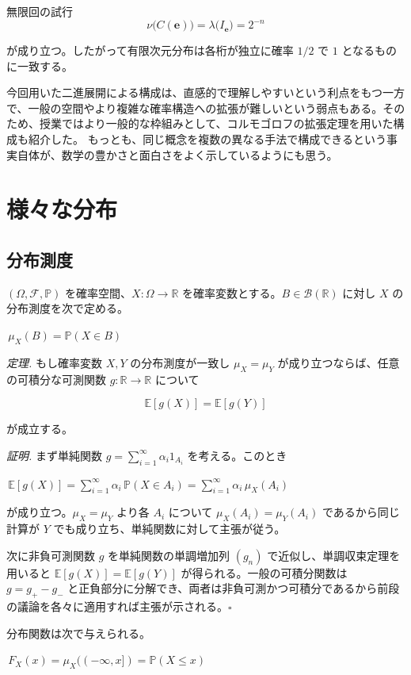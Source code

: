 \documentclass[uplatex,dvipdfmx,11pt,a4paper,openany]{bxjsbook}
\newcommand{\columnheading}[1]{\par\medskip{\large\color{ColumnInk}#1}\par\smallskip}
\begin{document}
\begin{columnbox}{無限回の試行}
\[
            \nu\bigl(C(\mathbf{e})\bigr) = \lambda\bigl(I_{\mathbf{e}}\bigr) = 2^{-n}
          \]

が成り立つ。したがって有限次元分布は各桁が独立に確率 $1/2$ で $1$ となるものに一致する。

\columnheading{まとめ}
今回用いた二進展開による構成は、直感的で理解しやすいという利点をもつ一方で、一般の空間やより複雑な確率構造への拡張が難しいという弱点もある。そのため、授業ではより一般的な枠組みとして、コルモゴロフの拡張定理を用いた構成も紹介した。
もっとも、同じ概念を複数の異なる手法で構成できるという事実自体が、数学の豊かさと面白さをよく示しているようにも思う。

\end{columnbox}

\chapter{様々な分布}
\section{分布測度}
$(\Omega,\mathcal{F},\mathbb{P})$ を確率空間、$X:\Omega\to\mathbb{R}$ を確率変数とする。$B\in\mathcal{B}(\mathbb{R})$ に対し $X$ の分布測度を次で定める。

$\,\mu_X(B)=\mathbb{P}(X\in B)\,$

\emph{定理.} もし確率変数 $X,Y$ の分布測度が一致し $\mu_X=\mu_Y$ が成り立つならば、任意の可積分な可測関数 $g:\mathbb{R}\to\mathbb{R}$ について

\[\mathbb{E}[g(X)]=\mathbb{E}[g(Y)]\]

が成立する。

\emph{証明.} まず単純関数 $g=\sum_{i=1}^{\infty} \alpha_i 1_{A_i}$ を考える。このとき

$\,\mathbb{E}[g(X)]=\sum_{i=1}^{\infty} \alpha_i\,\mathbb{P}(X\in A_i)=\sum_{i=1}^{\infty} \alpha_i\,\mu_X(A_i)\,$

が成り立つ。$\mu_X=\mu_Y$ より各 $A_i$ について $\mu_X(A_i)=\mu_Y(A_i)$ であるから同じ計算が $Y$ でも成り立ち、単純関数に対して主張が従う。

次に非負可測関数 $g$ を単純関数の単調増加列 $(g_n)$ で近似し、単調収束定理を用いると $\mathbb{E}[g(X)]=\mathbb{E}[g(Y)]$ が得られる。一般の可積分関数は $g=g_+-g_-$ と正負部分に分解でき、両者は非負可測かつ可積分であるから前段の議論を各々に適用すれば主張が示される。$\square$

分布関数は次で与えられる。

$\,F_X(x)=\mu_X((-\infty,x])=\mathbb{P}(X\le x)\,$
\end{document}
